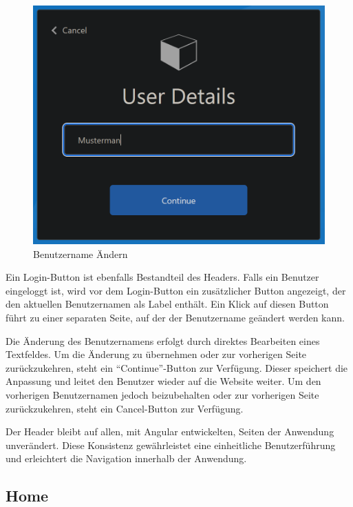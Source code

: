 \begin{figure} [h t]
    \centering
    \includegraphics[scale=0.4]{pics/benutzername_aendern.PNG}
    \caption{Benutzername Ändern}
    \label{fig:benutzername-aendern}
\end{figure}

Ein Login-Button ist ebenfalls Bestandteil des Headers. Falls ein Benutzer eingeloggt 
ist, wird vor dem Login-Button ein zusätzlicher Button angezeigt, der den aktuellen 
Benutzernamen als Label enthält. Ein Klick auf diesen Button führt zu einer separaten 
Seite, auf der der Benutzername geändert werden kann.

Die Änderung des Benutzernamens erfolgt durch direktes Bearbeiten eines Textfeldes. 
Um die Änderung zu übernehmen oder zur vorherigen Seite zurückzukehren, steht ein 
``Continue''-Button zur Verfügung. Dieser speichert die Anpassung und leitet den Benutzer 
wieder auf die Website weiter. Um den vorherigen Benutzernamen jedoch beizubehalten 
oder zur vorherigen Seite zurückzukehren, steht ein Cancel-Button zur Verfügung. 

Der Header bleibt auf allen, mit Angular entwickelten, Seiten der Anwendung unverändert. 
Diese Konsistenz gewährleistet eine einheitliche Benutzerführung und erleichtert die 
Navigation innerhalb der Anwendung.


\subsection{Home}

